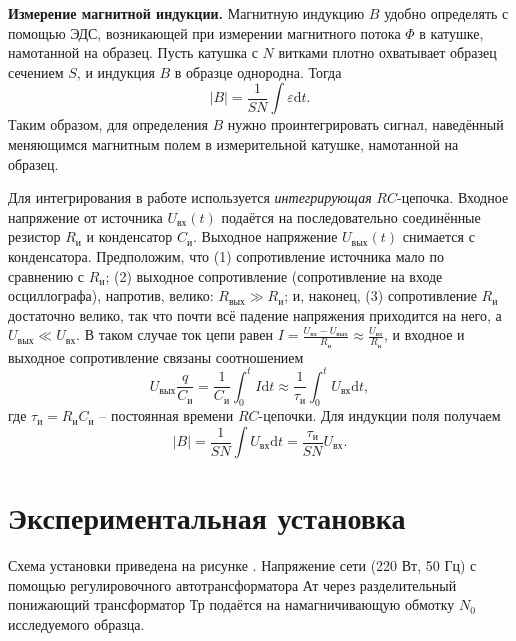 \documentclass[a4paper, 12pt]{article}
\begin{document}
\textbf{Измерение магнитной индукции.} Магнитную индукцию $B$ удобно определять с помощью ЭДС, возникающей при измерении магнитного потока $\Phi$ в катушке, намотанной на образец. Пусть катушка с $N$ витками плотно охватывает образец сечением $S$, и индукция $B$ в образце однородна. Тогда\[\left|B\right|=\frac{1}{SN}\int\varepsilon\text{d}t.\]Таким образом, для определения $B$ нужно проинтегрировать сигнал, наведённый меняющимся магнитным полем в измерительной катушке, намотанной на образец.

Для интегрирования в работе используется \textit{интегрирующая} $RC$-цепочка. Входное напряжение от источника $U_{\text{вх}}(t)$ подаётся на последовательно соединённые резистор $R_{\text{и}}$ и конденсатор $C_{\text{и}}$. Выходное напряжение $U_{\text{вых}}(t)$ снимается с конденсатора. Предположим, что (1) сопротивление источника мало по сравнению с $R_{\text{и}}$; (2) выходное сопротивление (сопротивление на входе осциллографа), напротив, велико: $R_{\text{вых}}\gg R_{\text{и}}$; и, наконец, (3) сопротивление $R_{\text{и}}$ достаточно велико, так что почти всё падение напряжения приходится на него, а $U_{\text{вых}}\ll U_{\text{вх}}$. В таком случае ток цепи равен $I=\frac{U_{\text{вх}}-U_{\text{вых}}}{R_{\text{и}}}\approx\frac{U_{\text{вх}}}{R_{\text{и}}}$, и входное и выходное сопротивление связаны соотношением\[U_{\text{вых}}\frac{q}{C_{\text{и}}}=\frac{1}{C_{\text{и}}}\int_0^tI\text{d}t\approx\frac{1}{\tau_{\text{и}}}\int_0^tU_{\text{вх}}\text{d}t,\]где $\tau_{\text{и}}=R_{\text{и}}C_{\text{и}}$ -- постоянная времени $RC$-цепочки. Для индукции поля получаем\[\left|B\right|=\frac{1}{SN}\int U_{\text{вх}}\text{d}t=\frac{\tau_{\text{и}}}{SN}U_{\text{вх}}.\]

\section*{Экспериментальная установка}

Схема установки приведена на рисунке . Напряжение сети (220 Вт, 50 Гц) с помощью регулировочного автотрансформатора Ат через разделительный понижающий трансформатор Тр подаётся на намагничивающую обмотку $N_0$ исследуемого образца.
\end{document}
